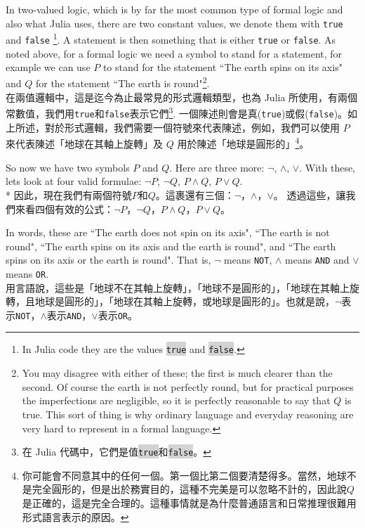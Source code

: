 \documentclass[]{article}
\newcommand{\codequote}[1]{\colorbox{lightgray}{\tt #1}}
\begin{document}
{\color{gray}In two-valued logic, which is by far the most common type of formal logic and also what Julia uses, there are two constant values, we denote them with {\tt true} and {\tt false} \footnote{In Julia code they are the values \codequote{true} and \codequote{false}.}. A statement is then something that is either {\tt true} or {\tt false}. As noted above, for a formal logic we need a symbol to stand for a statement, for example we can use $P$ to stand for the statement ``The earth spins on its axis" and $Q$ for the statement ``The earth is round"\footnote{You may disagree with either of these; the first is much clearer than the second. Of course the earth is not perfectly round, but for practical purposes the imperfections are negligible, so it is perfectly reasonable to say that $ Q $ is true. This sort of thing is why ordinary language and everyday reasoning are very hard to represent in a formal language.}.}
\\
{在兩值邏輯中，這是迄今為止最常見的形式邏輯類型，也為 Julia 所使用，有兩個常數值，我們用{\tt true}和{\tt false}表示它們\footnote{在 Julia 代碼中，它們是值\codequote{true}和\codequote{false}。}. 一個陳述則會是真({\tt true})或假({\tt false})。如上所述，對於形式邏輯，我們需要一個符號來代表陳述，例如，我們可以使用 $P$ 來代表陳述「地球在其軸上旋轉」及 $Q$ 用於陳述「地球是圓形的」\footnote{你可能會不同意其中的任何一個。第一個比第二個要清楚得多。當然，地球不是完全圓形的，但是出於務實目的，這種不完美是可以忽略不計的，因此說$ Q $是正確的，這是完全合理的。這種事情就是為什麼普通語言和日常推理很難用形式語言表示的原因。}。}

{\color{gray}So now we have two symbols $ P $ and $ Q $. Here are three more: $ \neg $, $ \land $, $ \lor $. With these, lets look at four valid formulae: $ \lnot P $, $ \lnot Q $, $ P \land Q $, $ P \lor Q$.}
\\*
{因此，現在我們有兩個符號$ P $和$ Q $。這裹還有三個：$ \neg $，$ \land $，$ \lor $。 透過這些，讓我們來看四個有效的公式：$ \lnot P $，$ \lnot Q $，$ P \land Q $，$ P \lor Q $。}

{\color{gray}In words, these are ``The earth does not spin on its axis", ``The earth is not round", ``The earth spins on its axis and the earth is round", and ``The earth spins on its axis or the earth is round". That is, $ \neg $ means {\tt NOT}, $ \land $ means {\tt AND} and $ \lor $ means {\tt OR}.}
\\
{用言語說，這些是「地球不在其軸上旋轉」，「地球不是圓形的」，「地球在其軸上旋轉，且地球是圓形的」，「地球在其軸上旋轉，或地球是圓形的」。也就是說，$ \neg $表示{\tt NOT}，$ \land $表示{\tt AND}，$ \lor $表示{\tt OR}。}
\end{document}
